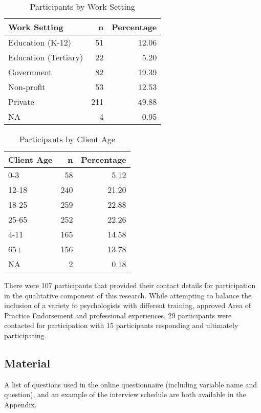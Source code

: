 \documentclass[
  english,
  man]{apa6}
\begin{document}
\begin{table}

\caption{\label{tab:workSettingParticipants}Participants by Work Setting}
\centering
\begin{tabular}[t]{l|r|r}
\hline
Work Setting & n & Percentage\\
\hline
Education (K-12) & 51 & 12.06\\
\hline
Education (Tertiary) & 22 & 5.20\\
\hline
Government & 82 & 19.39\\
\hline
Non-profit & 53 & 12.53\\
\hline
Private & 211 & 49.88\\
\hline
NA & 4 & 0.95\\
\hline
\end{tabular}
\end{table}

\begin{table}

\caption{\label{tab:clientAgeParticipants}Participants by Client Age}
\centering
\begin{tabular}[t]{l|r|r}
\hline
Client Age & n & Percentage\\
\hline
0-3 & 58 & 5.12\\
\hline
12-18 & 240 & 21.20\\
\hline
18-25 & 259 & 22.88\\
\hline
25-65 & 252 & 22.26\\
\hline
4-11 & 165 & 14.58\\
\hline
65+ & 156 & 13.78\\
\hline
NA & 2 & 0.18\\
\hline
\end{tabular}
\end{table}

There were 107 participants that provided their contact details for participation in the qualitative component of this research. While attempting to balance the inclusion of a variety fo psychologists with different training, approved Area of Practice Endorsement and professional experiences, 29 participants were contacted for participation with 15 participants responding and ultimately participating.

\hypertarget{material}{%
\subsection{Material}\label{material}}

A list of questions used in the online questionnaire (including variable name and question), and an example of the interview schedule are both available in the Appendix.
\end{document}

